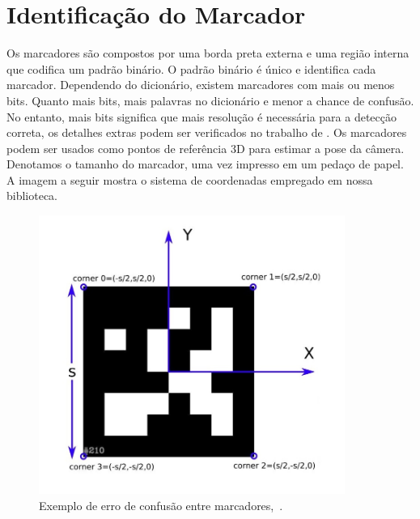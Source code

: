 \section{Identificação do Marcador}

Os marcadores são compostos por uma borda preta externa e uma região interna que codifica um padrão binário. O padrão binário é único e identifica cada marcador. Dependendo do dicionário, existem marcadores com mais ou menos bits. Quanto mais bits, mais palavras no dicionário e menor a chance de confusão. No entanto, mais bits significa que mais resolução é necessária para a detecção correta, os detalhes extras podem ser verificados no trabalho de \citet{Garrido2016}. Os marcadores podem ser usados como pontos de referência 3D para estimar a pose da câmera. Denotamos o tamanho do marcador, uma vez impresso em um pedaço de papel. A imagem a seguir mostra o sistema de coordenadas empregado em nossa biblioteca.

\begin{figure}[H]
	\centering
	\includegraphics[width=10cm, height=10 cm]{figuras/aruco-identificador.jpg}
	\caption{Exemplo de erro de confusão entre marcadores,~\cite{Salinas2013}.}
	\label{fig:aruco-identificador}
\end{figure}

